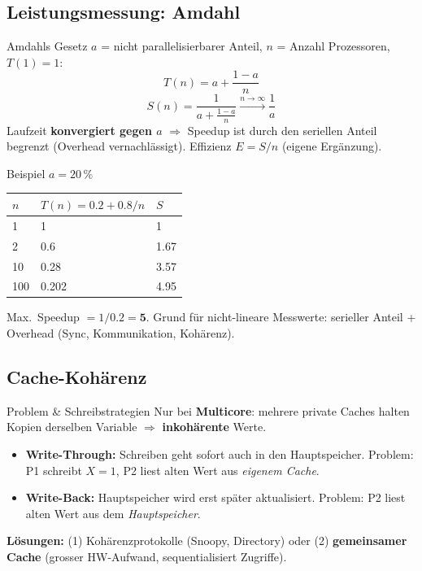 \documentclass[a4paper, fontsize=7pt]{scrartcl}
\renewcommand*{\arraystretch}{1.5}  %
\begin{document}
\subsection{Leistungsmessung: Amdahl}

\begin{mainbox}{Amdahls Gesetz}
$a$ = nicht parallelisierbarer Anteil, $n$ = Anzahl Prozessoren, $T(1) = 1$:
\[
\boxed{T(n) = a + \frac{1-a}{n}}
\]
\[
S(n) = \frac{1}{a + \frac{1-a}{n}} \xrightarrow{n\to\infty} \frac{1}{a}
\]
Laufzeit \textbf{konvergiert gegen $a$} $\Rightarrow$ Speedup ist durch den
seriellen Anteil begrenzt (Overhead vernachlässigt). Effizienz $E = S/n$
(eigene Ergänzung).
\end{mainbox}

\begin{subbox}{Beispiel $a = 20\,\%$}
\renewcommand*{\arraystretch}{1.15}
\begin{tabularx}{\linewidth}{@{}l|X|l@{}}
$n$ & $T(n) = 0.2 + 0.8/n$ & $S$ \\
\hline
1 & 1 & 1 \\
2 & 0.6 & 1.67 \\
10 & 0.28 & 3.57 \\
100 & 0.202 & 4.95 \\
\end{tabularx}
Max.\ Speedup $= 1/0.2 = \mathbf{5}$. Grund für nicht-lineare Messwerte:
serieller Anteil + Overhead (Sync, Kommunikation, Kohärenz).
\end{subbox}

\subsection{Cache-Kohärenz}

\begin{mainbox}{Problem \& Schreibstrategien}
Nur bei \textbf{Multicore}: mehrere private Caches halten Kopien derselben
Variable $\Rightarrow$ \textbf{inkohärente} Werte.
\begin{itemize}
    \item \textbf{Write-Through:} Schreiben geht sofort auch in den
          Hauptspeicher. Problem: P1 schreibt $X=1$, P2 liest alten Wert aus
          \emph{eigenem Cache}.
    \item \textbf{Write-Back:} Hauptspeicher wird erst später aktualisiert.
          Problem: P2 liest alten Wert aus dem \emph{Hauptspeicher}.
\end{itemize}
\textbf{Lösungen:} (1) Kohärenzprotokolle (Snoopy, Directory) oder
(2) \textbf{gemeinsamer Cache} (grosser HW-Aufwand, sequentialisiert Zugriffe).
\end{mainbox}
\end{document}
